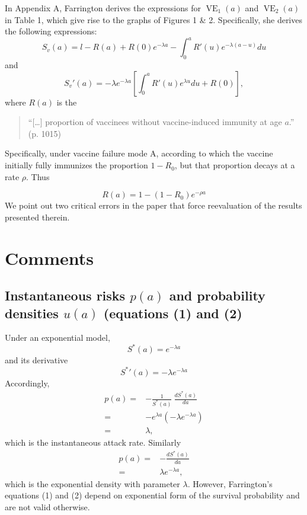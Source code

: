 \documentclass{article}[11pt]
\begin{document}
In Appendix A, Farrington derives the expressions for $\operatorname{VE}_1(a)$ and $\operatorname{VE}_2(a)$ in Table 1, which give rise to the graphs of Figures 1 \& 2.
Specifically, she derives the following expressions:
%
%
\begin{equation}
\label{eq:surv_prob_spec}
S_v(a) =l- R(a) + R(0) e^{-\lambda a} - \int_{0}^{a} R'(u) e^{-\lambda(a-u)} du
\end{equation}
%
and 
%
\begin{equation}
\label{eq:surv_prob_deriv}
S_v'(a) =- \lambda e^{-\lambda a} \left[ \int_{0}^{a} R'(u) e^{\lambda u} du + R(0)\right],
\end{equation}
%
where $R(a)$ is the  
\begin{quote}
	``[\ldots] proportion of vaccinees without vaccine-induced immunity at age $a$.'' (p. 1015)
\end{quote}
Specifically, under vaccine failure mode A, according to which the vaccine initially fully immunizes the proportion $1 - R_0$, but that proportion decays at a rate $\rho$. Thus

\begin{equation}
\label{eq:Ra}
R(a) = 1-(1-R_0) e^{-\rho a}
\end{equation}
%
We point out two critical errors in the paper that force reevaluation of the results presented therein.
%
\section*{Comments}
%
\subsection*{Instantaneous risks $p(a)$ and probability densities $u(a)$ (equations (1) and (2)}
Under an exponential model, 
%
\begin{equation}
\label{eq:S_alt}
S^\ast(a) = e^{-\lambda a}
\end{equation}
%
and its derivative
%
\begin{equation}
\label{eq:S_alt}
S^\ast'(a) = - \lambda e^{-\lambda a}
\end{equation}
%
Accordingly, 
%
%
\begin{align}
\nonumber
p(a) =& - \frac{1}{S^\ast (a)} \:\frac{dS^\ast(a)}{da}\\
\nonumber
 =& - e^{\lambda a} \left(- \lambda e^{-\lambda a} \right)\\
 \label{eq:inst_AR}
 =& \lambda,
\end{align}
%
which is the instantaneous attack rate. Similarly
%
\begin{align}
\nonumber
p(a) =& - \frac{dS^\ast(a)}{da}\\
\label{eq:failure_pd}
=& \lambda e^{-\lambda a},
\end{align}
%
which is the exponential density with parameter $\lambda$. However, Farrington's equations (1) and (2) depend on exponential form of the survival probability and are not valid otherwise.
%
\end{document}
